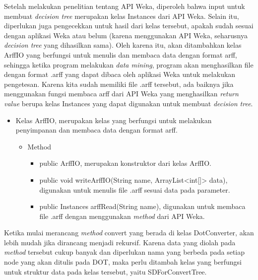 	Setelah melakukan penelitian tentang API Weka, diperoleh bahwa input untuk membuat \textsl{decision tree} merupakan kelas Instances dari API Weka. Selain itu, diperlukan juga pengecekkan untuk hasil dari kelas tersebut, apakah sudah sesuai dengan aplikasi Weka atau belum (karena menggunakan API Weka, seharusnya \textsl{decision tree} yang dihasilkan sama). Oleh karena itu, akan ditambahkan kelas ArffIO yang berfungsi untuk menulis dan membaca data dengan format arff, sehingga ketika program melakukan \textsl{data mining}, program akan menghasilkan file dengan format .arff yang dapat dibaca oleh aplikasi Weka untuk melakukan pengetesan. Karena kita sudah memiliki file .arff tersebut, ada baiknya jika menggunakan fungsi membaca arff dari API Weka yang menghasilkan \textsl{return value} berupa kelas Instances yang dapat digunakan untuk membuat \textsl{decision tree}.

\begin{itemize}
	\item Kelas ArffIO, merupakan kelas yang berfungsi untuk melakukan penyimpanan dan membaca data dengan format arff.
	\begin{itemize}
		\item Method
		\begin{itemize}
			\item public ArffIO, merupakan konstruktor dari kelas ArffIO.
			\item public void writeArffIO(String name, ArrayList<int[]> data), digunakan untuk menulis file .arff sesuai data pada parameter.
			\item public Instances arffRead(String name), digunakan untuk membaca file .arff dengan menggunakan \textsl{method} dari API Weka.
		\end{itemize}
	\end{itemize}
\end{itemize}

Ketika mulai merancang \textsl{method} convert yang berada di kelas DotConverter, akan lebih mudah jika dirancang menjadi rekursif. Karena data yang diolah pada \textsl{method}
tersebut cukup banyak dan diperlukan nama yang berbeda pada setiap node yang akan ditulis pada DOT, maka perlu ditambah kelas yang berfungsi untuk struktur data pada kelas tersebut, yaitu SDForConvertTree.

